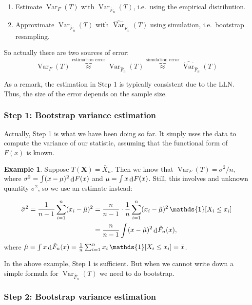 \documentclass[
]{book}
\newcommand{\bX}{{\boldsymbol X}}
\DeclareMathOperator{\Var}{Var}
\DeclareMathOperator{\ind}{\mathds{1}}
\DeclareMathOperator{\dd}{d}
\newcommand{\dint}{\dd\hspace{0.5pt}\!}
\theoremstyle{definition}
\theoremstyle{definition}
\newtheorem{example}{Example}[chapter]
\theoremstyle{definition}
\theoremstyle{definition}
\theoremstyle{remark}
\begin{document}
\begin{enumerate}
\def\labelenumi{\arabic{enumi}.}
\item
  Estimate \(\Var_F(T)\) with \(\Var_{\hat F_n}(T)\), i.e.~using the empirical distribution.
\item
  Approximate \(\Var_{\hat F_n}(T)\) with \(\widehat{\Var}_{\hat F_n}(T)\) using simulation, i.e.~bootstrap resampling.
\end{enumerate}

So actually there are two sources of error:
\[
\Var_F(T) \overbrace{\approx}^{\text{estimation error}} \Var_{\hat F_n}(T) \overbrace{\approx}^{\text{simulation error}} \widehat{\Var}_{\hat F_n}(T)
\]

As a remark, the estimation in Step 1 is typically consistent due to the LLN. Thus, the size of the error depends on the sample size.

\hypertarget{step-1-bootstrap-variance-estimation}{%
\subsubsection{Step 1: Bootstrap variance estimation}\label{step-1-bootstrap-variance-estimation}}

Actually, Step 1 is what we have been doing so far. It simply uses the data to compute the variance of our statistic, assuming that the functional form of \(F(x)\) is known.

\begin{example}
Suppose \(T(\bX)=\bar X_n\). Then we know that \(\Var_F(T)=\sigma^2/n\), where \(\sigma^2 = \int (x-\mu)^2 \dint F(x)\) and \(\mu = \int x \dint F(x)\). Still, this involves and unknown quantity \(\sigma^2\), so we use an estimate instead:

\begin{align*}
\hat\sigma^2
=\frac{1}{n-1} \sum_{i=1}^n (x_i-\hat \mu)^2 
&= \frac{n}{n-1} \cdot \frac{1}{n}  \sum_{i=1}^n (x_i-\hat \mu)^2 \ind [X_i\leq x_i] \\
&= \frac{n}{n-1}  \int (x-\hat\mu)^2\dint \hat F_n(x),
\end{align*}
where \(\hat\mu = \int x \dint \hat F_n(x)= \frac{1}{n} \sum_{i=1}^n x_i \ind [X_i\leq x_i] = \bar x\).
\end{example}

In the above example, Step 1 is sufficient. But when we cannot write down a simple formula for \(\Var_{\hat F_n}(T)\) we need to do bootstrap.

\hypertarget{step-2-bootstrap-variance-estimation}{%
\subsubsection{Step 2: Bootstrap variance estimation}\label{step-2-bootstrap-variance-estimation}}
\end{document}
